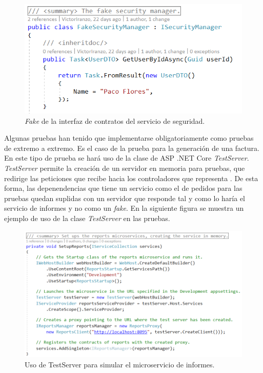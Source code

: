 \documentclass[11pt,spanish,listoffigures]{tfgetsinf}
\begin{document}
\begin{figure}[h]
\centering
\includegraphics[scale=0.8]{FakeSecurityManager}
\caption{\textit{Fake} de la interfaz de contratos del servicio de seguridad.}
\label{fig:FakeSecurityManager}
\end{figure}

Algunas pruebas han tenido que implementarse obligatoriamente como pruebas de extremo a extremo. Es el caso de la prueba para la generación de una factura. En este tipo de prueba se hará uso de la clase de ASP .NET Core \textit{TestServer}. \textit{TestServer} permite la creación de un servidor en memoria para pruebas, que redirige las peticiones que recibe hacia los controladores que representa \cite{Roberts2017}. De esta forma, las depenendencias que tiene un servicio como el de pedidos para las pruebas quedan suplidas con un servidor que responde tal y como lo haría el servicio de informes y no como un \textit{fake}. En la siguiente figura se muestra un ejemplo de uso de la clase \textit{TestServer} en las pruebas.

\begin{figure}[h]
\centering
\includegraphics[scale=0.7]{TestServer}
\caption{Uso de TestServer para simular el microservicio de informes.}
\end{figure}
\end{document}
